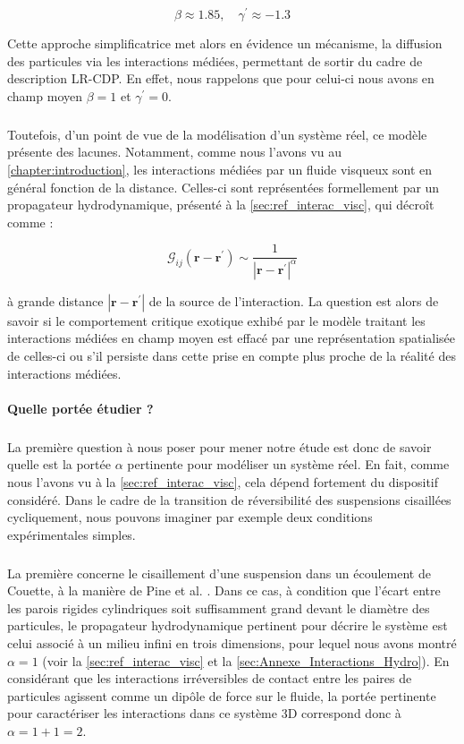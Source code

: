 \begin{equation}
	\beta \approx 1.85, \quad \gamma^\prime \approx -1.3 
\end{equation}

\noindent Cette approche simplificatrice met alors en évidence un mécanisme, la diffusion des particules via les interactions médiées, permettant de sortir du cadre de description LR-CDP. En effet, nous rappelons que pour celui-ci nous avons en champ moyen $\beta = 1$ et $\gamma^\prime = 0$. 

\subparagraph{}Toutefois, d'un point de vue de la modélisation d'un système réel, ce modèle présente des lacunes. Notamment, comme nous l'avons vu au \autoref{chapter:introduction}, les interactions médiées par un fluide visqueux sont en général fonction de la distance. Celles-ci sont représentées formellement par un propagateur hydrodynamique, présenté à la \autoref{sec:ref_interac_visc}, qui décroît comme :

\begin{equation}
	\mathcal{G}_{ij}(\mathbf{r} - \mathbf{r}^\prime) \sim \frac{1}{|\mathbf{r} - \mathbf{r}^\prime|^\alpha}
\end{equation}

\noindent à grande distance $|\mathbf{r} - \mathbf{r}^\prime|$ de la source de l'interaction. La question est alors de savoir si le comportement critique exotique exhibé par le modèle traitant les interactions médiées en champ moyen est effacé par une représentation spatialisée de celles-ci ou s'il persiste dans cette prise en compte plus proche de la réalité des interactions médiées.

\paragraph{Quelle portée étudier ?}

\subparagraph{}La première question à nous poser pour mener notre étude est donc de savoir quelle est la portée $\alpha$ pertinente pour modéliser un système réel. En fait, comme nous l'avons vu à la \autoref{sec:ref_interac_visc}, cela dépend fortement du dispositif considéré. Dans le cadre de la transition de réversibilité des suspensions cisaillées cycliquement, nous pouvons imaginer par exemple deux conditions expérimentales simples.

\subparagraph{}La première concerne le cisaillement d'une suspension dans un écoulement de Couette, à la manière de Pine et al. \cite{pine_chaos_2005}. Dans ce cas, à condition que l'écart entre les parois rigides cylindriques soit suffisamment grand devant le diamètre des particules, le propagateur hydrodynamique pertinent pour décrire le système est celui associé à un milieu infini en trois dimensions, pour lequel nous avons montré $\alpha = 1$ (voir la \autoref{sec:ref_interac_visc} et la \autoref{sec:Annexe_Interactions_Hydro}). En considérant que les interactions irréversibles de contact entre les paires de particules agissent comme un dipôle de force sur le fluide, la portée pertinente pour caractériser les interactions dans ce système 3D correspond donc à $\alpha = 1+1 =2$.

